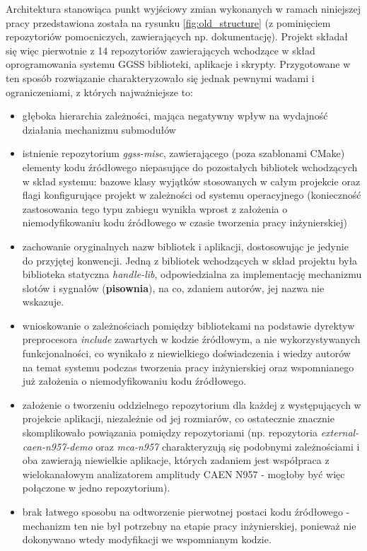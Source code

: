 Architektura stanowiąca punkt wyjściowy zmian wykonanych w ramach niniejszej pracy przedstawiona została na rysunku \ref{fig:old_structure} (z pominięciem repozytoriów pomocniczych, zawierających np. dokumentację). Projekt składał się więc pierwotnie z 14 repozytoriów zawierających wchodzące w skład oprogramowania systemu GGSS biblioteki, aplikacje i skrypty. Przygotowane w ten sposób rozwiązanie charakteryzowało się jednak pewnymi wadami i ograniczeniami, z których najważniejsze to:
\begin{itemize}
    \item głęboka hierarchia zależności, mająca negatywny wpływ na wydajność działania mechanizmu submodułów
    \item istnienie repozytorium \emph{ggss-misc}, zawierającego (poza szablonami CMake) elementy kodu źródłowego niepasujące do pozostałych bibliotek wchodzących w skład systemu: bazowe klasy wyjątków stosowanych w całym projekcie oraz flagi konfigurujące projekt w zależności od systemu operacyjnego (konieczność zastosowania tego typu zabiegu wynikła wprost z założenia o niemodyfikowaniu kodu źródłowego w czasie tworzenia pracy inżynierskiej)
    \item zachowanie oryginalnych nazw bibliotek i aplikacji, dostosowując je jedynie do przyjętej konwencji. Jedną z bibliotek wchodzących w skład projektu była biblioteka statyczna \emph{handle-lib}, odpowiedzialna za implementację mechanizmu slotów i sygnałów (\textbf{pisownia}), na co, zdaniem autorów, jej nazwa nie wskazuje.
    \item wnioskowanie o zależnościach pomiędzy bibliotekami na podstawie dyrektyw preprocesora \emph{include} zawartych w kodzie źródłowym, a nie wykorzystywanych funkcjonalności, co wynikało z niewielkiego doświadczenia i wiedzy autorów na temat systemu podczas tworzenia pracy inżynierskiej oraz wspomnianego już założenia o niemodyfikowaniu kodu źródłowego.
    \item założenie o tworzeniu oddzielnego repozytorium dla każdej z występujących w projekcie aplikacji, niezależnie od jej rozmiarów, co ostatecznie znacznie skomplikowało powiązania pomiędzy repozytoriami (np. repozytoria \emph{external-caen-n957-demo} oraz \emph{mca-n957} charakteryzują się podobnymi zależnościami i oba zawierają niewielkie aplikacje, których zadaniem jest współpraca z wielokanałowym analizatorem amplitudy CAEN N957 - mogłoby być więc połączone w jedno repozytorium).
    \item brak łatwego sposobu na odtworzenie pierwotnej postaci kodu źródłowego - mechanizm ten nie był potrzebny na etapie pracy inżynierskiej, ponieważ nie dokonywano wtedy modyfikacji we wspomnianym kodzie.
\end{itemize}

